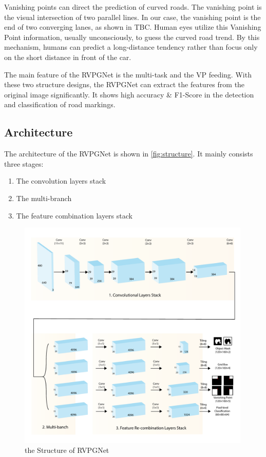 \begin{spacing}{1.5}
Vanishing points can direct the prediction of curved roads. The vanishing point is the visual intersection of two parallel lines. In our case, the vanishing point is the end of two converging lanes, as shown in TBC. Human eyes utilize this Vanishing Point information, usually unconsciously, to guess the curved road trend. By this mechanism, humans can predict a long-distance tendency rather than focus only on the short distance in front of the car.

The main feature of the RVPGNet is the multi-task and the VP feeding. With these two structure designs, the RVPGNet can extract the features from the original image significantly. It shows high accuracy \& F1-Score in the detection and classification of road markings.

\subsection{Architecture}

The architecture of the RVPGNet is shown in \autoref{fig:structure}. It mainly consists three stages:

\begin{enumerate} \vspace{-5mm}
    \item The convolution layers stack
    \item The multi-branch
    \item The feature combination layers stack
\end{enumerate} \vspace{-5mm}

\begin{figure}[ht]
\centering
\includegraphics[width=0.99\textwidth, fbox]{Chapter3/structure.pdf}
\caption{the Structure of RVPGNet}
\label{fig:structure} 
\end{figure}


\end{spacing}
